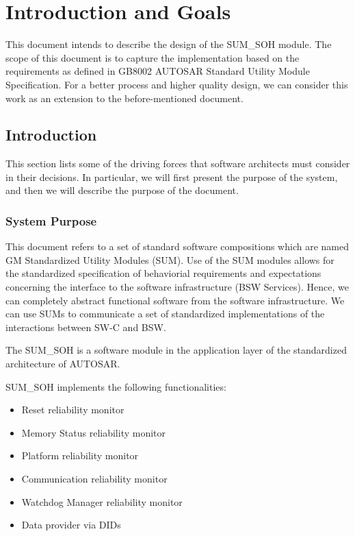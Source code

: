 \chapter{Introduction and Goals}

This document intends to describe the design of the SUM_SOH module.
The scope of this document is to capture the implementation based on the requirements as defined in GB8002 AUTOSAR Standard Utility Module Specification.
For a better process and higher quality design, we can consider this work as an extension to the before-mentioned document.

\section{Introduction}
This section lists some of the driving forces that software architects must consider in their decisions. In particular, we will first present the purpose of the system, and then we will describe the purpose of the document.

\subsection{System Purpose}

This document refers to a set of standard software compositions which are named GM Standardized Utility Modules (SUM).
Use of the SUM modules allows for the standardized specification of behaviorial requirements and expectations concerning the interface to the software infrastructure (BSW Services).
Hence, we can completely abstract functional software from the software infrastructure.
We can use SUMs to communicate a set of standardized implementations of the interactions between SW-C and BSW.

The SUM_SOH is a software module in the application layer of the standardized architecture of AUTOSAR.

SUM_SOH implements the following functionalities:

\begin{itemize}
	\item Reset reliability monitor
	\item Memory Status reliability monitor
	\item Platform reliability monitor
	\item Communication reliability monitor
	\item Watchdog Manager reliability monitor
	\item Data provider via DIDs
\end{itemize}



